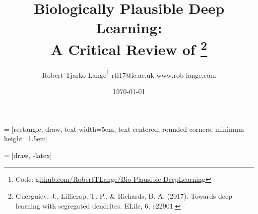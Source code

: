 \documentclass[dvipsnames, usenames]{beamer}
\begin{document}

 = [rectangle, draw, 
    text width=5em, text centered, rounded corners, minimum height=1.5em]
    
 = [draw, -latex]

\title{Biologically Plausible Deep Learning: \\ A Critical Review of \citet{guerguiev2017} \thanks{Guerguiev, J., Lillicrap, T. P., \& Richards, B. A. (2017). Towards deep learning with segregated dendrites. ELife, 6, e22901.}}
\subtitle{}

\author{\texorpdfstring{Robert Tjarko Lange\thanks{Code: \url{github.com/RobertTLange/Bio-Plausible-DeepLearning}}
						\newline\url{rtl17@ic.ac.uk}
						\newline\url{www.rob-lange.com}
	}
	{Author}}


\date{\today}



\begin{frame}[noframenumbering]

\titlepage
\end{frame}
\end{document}
